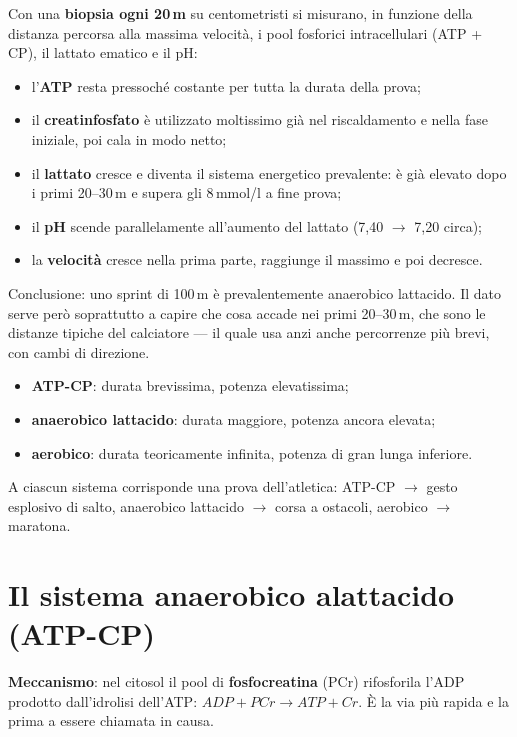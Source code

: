 Con una \textbf{biopsia ogni 20\,m} su centometristi si misurano, in funzione della distanza
percorsa alla massima velocità, i pool fosforici intracellulari (ATP + CP), il lattato ematico e il
pH:
\begin{itemize}
  \item l'\textbf{ATP} resta pressoché costante per tutta la durata della prova;
  \item il \textbf{creatinfosfato} è utilizzato moltissimo già nel riscaldamento e nella fase
    iniziale, poi cala in modo netto;
  \item il \textbf{lattato} cresce e diventa il sistema energetico prevalente: è già elevato dopo i
    primi 20--30\,m e supera gli 8\,mmol/l a fine prova;
  \item il \textbf{pH} scende parallelamente all'aumento del lattato (7,40 $\rightarrow$ 7,20
    circa);
  \item la \textbf{velocità} cresce nella prima parte, raggiunge il massimo e poi decresce.
\end{itemize}
Conclusione: uno sprint di 100\,m è prevalentemente anaerobico lattacido. Il dato serve però
soprattutto a capire che cosa accade nei primi 20--30\,m, che sono le distanze tipiche del
calciatore --- il quale usa anzi anche percorrenze più brevi, con cambi di direzione.

\begin{itemize}
  \item \textbf{ATP-CP}: durata brevissima, potenza elevatissima;
  \item \textbf{anaerobico lattacido}: durata maggiore, potenza ancora elevata;
  \item \textbf{aerobico}: durata teoricamente infinita, potenza di gran lunga inferiore.
\end{itemize}
A ciascun sistema corrisponde una prova dell'atletica: ATP-CP $\rightarrow$ gesto esplosivo di
salto, anaerobico lattacido $\rightarrow$ corsa a ostacoli, aerobico $\rightarrow$ maratona.

\section{Il sistema anaerobico alattacido (ATP-CP)}

\textbf{Meccanismo}: nel citosol il pool di \textbf{fosfocreatina} (PCr) rifosforila l'ADP prodotto
dall'idrolisi dell'ATP: $ADP + PCr \rightarrow ATP + Cr$. È la via più rapida e la prima a essere
chiamata in causa.


